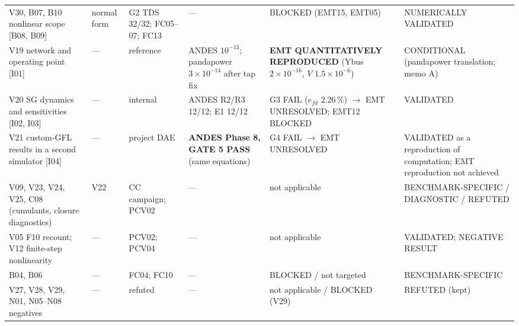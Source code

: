 \documentclass[10pt,a4paper]{article}
\begin{document}
{\begin{longtable}{@{}L{3.0cm}L{1.5cm}L{2.0cm}L{2.0cm}L{3.1cm}L{3.0cm}@{}}
V30, B07, B10 nonlinear scope [B08, B09] & normal form & G2 TDS 32/32; FC05--07; FC13 & --- & BLOCKED (EMT15, EMT05) & NUMERICALLY VALIDATED\\
V19 network and operating point [I01] & --- & reference & ANDES $10^{-13}$; pandapower $3\times10^{-14}$ after tap fix & \textbf{EMT QUANTITATIVELY REPRODUCED} (Ybus $2\times10^{-16}$, $V$ $1.5\times10^{-6}$) & CONDITIONAL (pandapower translation; memo A)\\
V20 SG dynamics and sensitivities [I02, I03] & --- & internal & ANDES R2/R3 12/12; E1 12/12 & G3 FAIL ($e_{fd}$ 2.26\,\%) $\to$ EMT UNRESOLVED; EMT12 BLOCKED & VALIDATED\\
V21 custom-GFL results in a second simulator [I04] & --- & project DAE & \textbf{ANDES Phase 8, GATE 5 PASS} (same equations) & G4 FAIL $\to$ EMT UNRESOLVED & VALIDATED as a reproduction of computation; EMT reproduction not achieved\\
V09, V23, V24, V25, C08 (cumulants, closure diagnostics) & V22 & CC campaign; PCV02 & --- & not applicable & BENCHMARK-SPECIFIC / DIAGNOSTIC / REFUTED\\
V05 F10 recount; V12 finite-step nonlinearity & --- & PCV02; PCV04 & --- & not applicable & VALIDATED; NEGATIVE RESULT\\
B04, B06 & --- & FC04; FC10 & --- & BLOCKED / not targeted & BENCHMARK-SPECIFIC\\
V27, V28, V29, N01, N05--N08 negatives & --- & refuted & --- & not applicable / BLOCKED (V29) & REFUTED (kept)\\
\bottomrule
\end{longtable}}
\end{document}
